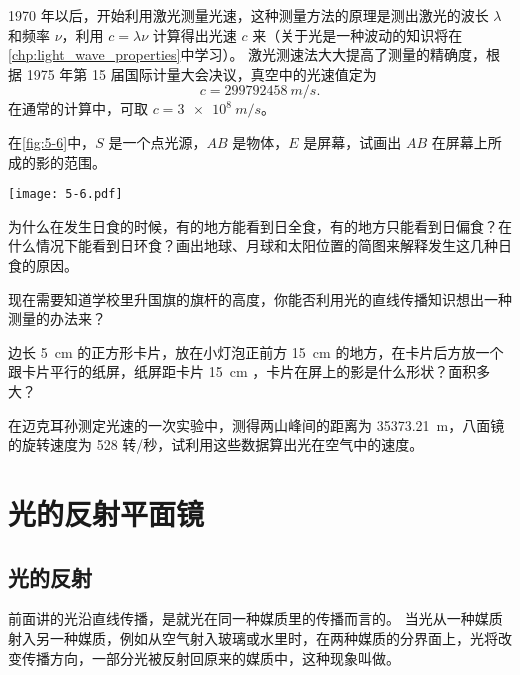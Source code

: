 1970 年以后，开始利用激光测量光速，这种测量方法的原理是测出激光的波长 $\lambda$ 和频率 $\nu$，利用 $c=\lambda\nu$ 计算得出光速 $c$ 来（关于光是一种波动的知识将在\cref{chp:light_wave_properties}中学习）。
激光测速法大大提高了测量的精确度，根据 1975 年第 15 届国际计量大会决议，真空中的光速值定为
\[c=\qty{299792458}{m/s}.\]
在通常的计算中，可取 $c=\qty{3e8}{m/s}$。

\begin{Practice}
\begin{question}
  \item 在\cref{fig:5-6}中，$S$ 是一个点光源，$AB$ 是物体，$E$ 是屏幕，试画出 $AB$ 在屏幕上所成的影的范围。
  \begin{figurehere}
    \begin{minipage}{\linewidth}\centering
      \texttt{[image: 5-6.pdf]}
      \caption{}\label{fig:5-6}
    \end{minipage}
  \end{figurehere}
  \item 为什么在发生日食的时候，有的地方能看到日全食，有的地方只能看到日偏食？在什么情况下能看到日环食？画出地球、月球和太阳位置的简图来解释发生这几种日食的原因。
  \item 现在需要知道学校里升国旗的旗杆的高度，你能否利用光的直线传播知识想出一种测量的办法来？
  \item 边长 \qty{5}{cm} 的正方形卡片，放在小灯泡正前方 \qty{15}{cm} 的地方，在卡片后方放一个跟卡片平行的纸屏，纸屏距卡片 \qty{15}{cm} ，卡片在屏上的影是什么形状？面积多大？
  \item 在迈克耳孙测定光速的一次实验中，测得两山峰间的距离为 \qty{35373.21}{m}，八面镜的旋转速度为 528 转/秒，试利用这些数据算出光在空气中的速度。
\end{question}
\end{Practice}

\section{光的反射\texorpdfstring{\quad}{ }平面镜}
\subsection{光的反射}
前面讲的光沿直线传播，是就光在同一种媒质里的传播而言的。
当光从一种媒质射入另一种媒质，例如从空气射入玻璃或水里时，在两种媒质的分界面上，光将改变传播方向，一部分光被反射回原来的媒质中，这种现象叫做。

